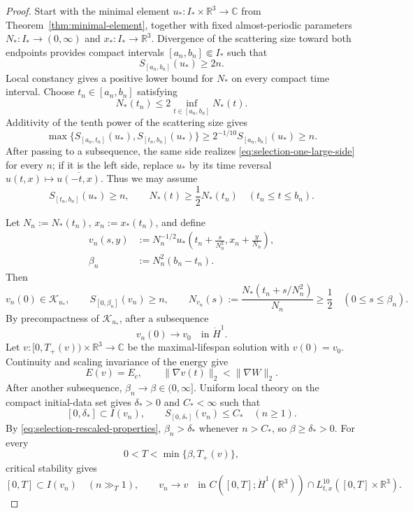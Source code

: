 \documentclass{interact}
\numberwithin{equation}{section}
\theoremstyle{plain}
\theoremstyle{definition}
\theoremstyle{remark}
\newcommand{\R}{\mathbb R}
\newcommand{\C}{\mathbb C}
\begin{document}
\begin{proof}
Start with the minimal element $u_*:I_*\times\R^3\to\C$ from Theorem~\ref{thm:minimal-element}, together with fixed almost-periodic parameters $N_*:I_*\to(0,\infty)$ and $x_*:I_*\to\R^3$. Divergence of the scattering size toward both endpoints provides compact intervals $[a_n,b_n]\Subset I_*$ such that
\[
 S_{[a_n,b_n]}(u_*)\ge2n.
\]
Local constancy gives a positive lower bound for $N_*$ on every compact time interval. Choose $t_n\in[a_n,b_n]$ satisfying
\[
 N_*(t_n)\le2\inf_{t\in[a_n,b_n]}N_*(t).
\]
Additivity of the tenth power of the scattering size gives
\begin{equation}\label{eq:selection-one-large-side}
 \max\bigl\{S_{[a_n,t_n]}(u_*),S_{[t_n,b_n]}(u_*)\bigr\}
 \ge2^{-1/10}S_{[a_n,b_n]}(u_*)\ge n.
\end{equation}
After passing to a subsequence, the same side realizes \eqref{eq:selection-one-large-side} for every $n$; if it is the left side, replace $u_*$ by its time reversal $u(t,x)\mapsto\overline{u(-t,x)}$. Thus we may assume
\[
 S_{[t_n,b_n]}(u_*)\ge n,
 \qquad
 N_*(t)\ge\frac12N_*(t_n)
 \quad(t_n\le t\le b_n).
\]

Let $N_n:=N_*(t_n)$, $x_n:=x_*(t_n)$, and define
\begin{align*}
 v_n(s,y)
 &:=N_n^{-1/2}
 u_*\left(t_n+\frac{s}{N_n^2},x_n+\frac{y}{N_n}\right),\\
 \beta_n&:=N_n^2(b_n-t_n).
\end{align*}
Then
\begin{equation}\label{eq:selection-rescaled-properties}
 v_n(0)\in\mathcal K_{u_*},
 \qquad
 S_{[0,\beta_n]}(v_n)\ge n,
 \qquad
 N_{v_n}(s):=\frac{N_*(t_n+s/N_n^2)}{N_n}\ge\frac12
 \quad(0\le s\le\beta_n).
\end{equation}
By precompactness of $\mathcal K_{u_*}$, after a subsequence
\[
 v_n(0)\longrightarrow v_0
 \quad\text{in }\dot H^1.
\]
Let $v:[0,T_+(v))\times\R^3\to\C$ be the maximal-lifespan solution with $v(0)=v_0$. Continuity and scaling invariance of the energy give
\[
 E(v)=E_c,
 \qquad
 \|\nabla v(t)\|_2<\|\nabla W\|_2.
\]
After another subsequence, $\beta_n\to\beta\in(0,\infty]$. Uniform local theory on the compact initial-data set gives $\delta_*>0$ and $C_*<\infty$ such that
\[
 [0,\delta_*]\subset I(v_n),
 \qquad
 S_{[0,\delta_*]}(v_n)\le C_*
 \quad(n\ge1).
\]
By \eqref{eq:selection-rescaled-properties}, $\beta_n>\delta_*$ whenever $n>C_*$, so $\beta\ge\delta_*>0$. For every
\[
 0<T<\min\{\beta,T_+(v)\},
\]
critical stability gives
\[
 [0,T]\subset I(v_n)\quad(n\gg_T1),
 \qquad
 v_n\longrightarrow v
 \quad\text{in }C([0,T];\dot H^1(\R^3))\cap L_{t,x}^{10}([0,T]\times\R^3).
\]


\end{proof}
\end{document}
